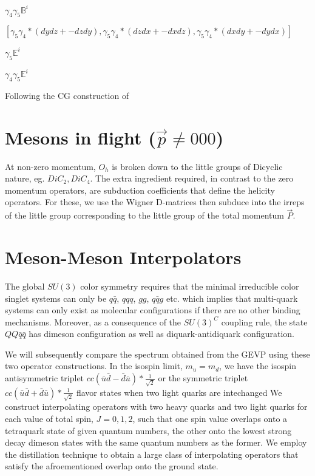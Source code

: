 \begin{table}
$\gamma_4\gamma_5\mathbb{B}^i$

$[\gamma_5\gamma_4 * (dydz + -dzdy), \gamma_5\gamma_4 * (dzdx + -dxdz), \gamma_5\gamma_4 * (dxdy + -dydx)]$

$\gamma_5\mathbb{E}^i$

$\gamma_4\gamma_5\mathbb{E}^i$



Following the CG construction of \cite{Basak_2005}

\section{Mesons in flight ($\vec{p}\neq 000$)}

At non-zero momentum, $O_h$ is broken down to the little groups of Dicyclic nature, eg. $DiC_2, DiC_4$. The extra ingredient required, in contrast to the zero momentum operators, are subduction coefficients that define the helicity operators. For these, we use the Wigner D-matrices then subduce into the irreps of the little group corresponding to the little group of the total momentum $\vec{P}$. 

\section{Meson-Meson Interpolators}
The global $SU(3)$ color symmetry requires that the minimal irreducible color singlet systems can only be $q\bar{q}$, $qqq$, $gg$, $q\bar{q}g$ etc. which implies that multi-quark systems can only exist as molecular configurations if there are no other binding mechanisms. Moreover, as a consequence of the $SU(3)^C$ coupling rule, the state $QQ\bar{q}\bar{q}$ has dimeson configuration as well as diquark-antidiquark configuration. 

We will subsequently compare the spectrum obtained from the GEVP using these two operator constructions. 
In the isospin limit, $m_u = m_d$, we have the isospin antisymmetric triplet $cc(\bar{u}\bar{d} - \bar{d}\bar{u}) * \frac{1}{\sqrt{2}}$ or the symmetric triplet $cc(\bar{u}\bar{d} + \bar{d}\bar{u}) * \frac{1}{\sqrt{2}}$  flavor states when two light quarks are intechanged \cite{Pacheco_2023} We construct interpolating operators with two heavy quarks and two light quarks for each value of total spin, $J=0,1,2$, such that one spin value overlaps onto a tetraquark state of given quantum numbers, the other onto the lowest strong decay dimeson states with the same quantum numbers as the former. We employ the distillation technique to obtain a large class of interpolating operators that satisfy the afroementioned overlap onto the ground state. 


\end{table}
